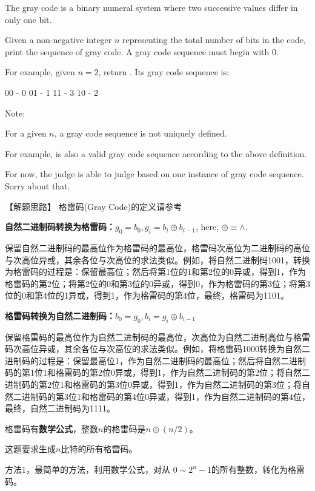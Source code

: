The gray code is a binary numeral system where two successive values differ in
only one bit.

Given a non-negative integer $n$ representing the total number of bits in the
code, print the sequence of gray code. A gray code sequence must begin with 0.

For example, given $n = 2$, return \fn{[0,1,3,2]}. Its gray code sequence is:
\begin{Code}
	00 - 0
	01 - 1
	11 - 3
	10 - 2
\end{Code}

Note:
\begindot
\item For a given $n$, a gray code sequence is not uniquely defined.
\item For example, \fn{[0,2,3,1]} is also a valid gray code sequence according
to the above definition.
\item For now, the judge is able to judge based on one instance of gray code
sequence. Sorry about that.
\myenddot


【解题思路】
格雷码(Gray Code)的定义请参考 

\textbf{自然二进制码转换为格雷码：$g_0=b_0, g_i=b_i \oplus b_{i-1}$}, here, $\oplus\equiv \wedge$.

保留自然二进制码的最高位作为格雷码的最高位，格雷码次高位为二进制码的高位与次高位异或，其余各位与次高位的求法类似。例如，将自然二进制码1001，转换为格雷码的过程是：保留最高位；然后将第1位的1和第2位的0异或，得到1，作为格雷码的第2位；将第2位的0和第3位的0异或，得到0，作为格雷码的第3位；将第3位的0和第4位的1异或，得到1，作为格雷码的第4位，最终，格雷码为1101。

\textbf{格雷码转换为自然二进制码：$b_0=g_0, b_i=g_i \oplus b_{i-1}$}

保留格雷码的最高位作为自然二进制码的最高位，次高位为自然二进制高位与格雷码次高位异或，其余各位与次高位的求法类似。例如，将格雷码1000转换为自然二进制码的过程是：保留最高位1，作为自然二进制码的最高位；然后将自然二进制码的第1位1和格雷码的第2位0异或，得到1，作为自然二进制码的第2位；将自然二进制码的第2位1和格雷码的第3位0异或，得到1，作为自然二进制码的第3位；将自然二进制码的第3位1和格雷码的第4位0异或，得到1，作为自然二进制码的第4位，最终，自然二进制码为1111。

格雷码有\textbf{数学公式}，整数$n$的格雷码是$n \oplus (n/2)$。

这题要求生成$n$比特的所有格雷码。

方法1，最简单的方法，利用数学公式，对从 $0\sim2^n-1$的所有整数，转化为格雷码。

